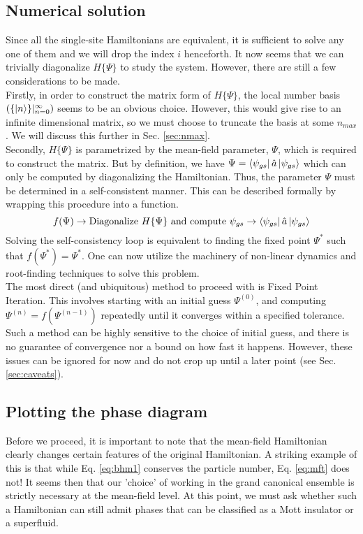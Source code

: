\subsection{Numerical solution}
Since all the single-site Hamiltonians are equivalent, it is sufficient to solve any one of them and we will drop the index $i$ henceforth. It now seems that we can trivially diagonalize $H\{\Psi\}$ to study the system. However, there are still a few considerations to be made. 
\vspace{0.5cm}\\
Firstly, in order to construct the matrix form of $H\{\Psi\}$, the local number basis $(\{\ket{n}\}|_{n = 0}^{\infty})$ seems to be an obvious choice. However, this would give rise to an infinite dimensional matrix, so we must choose to truncate the basis at some $n_{max}$. We will discuss this further in Sec. \ref{sec:nmax}.
\vspace{0.5cm}\\
Secondly, $H\{\Psi\}$ is parametrized by the mean-field parameter, $\Psi$, which is required to construct the matrix. But by definition, we have $\Psi = \bra{\psi_{gs}}\hat{a}\ket{\psi_{gs}}$ which can only be computed by diagonalizing the Hamiltonian. Thus, the parameter $\Psi$ must be determined in a self-consistent manner. This can be described formally by wrapping this procedure into a function.
\begin{equation}\label{eq:self_fn}
    f(\Psi) \rightarrow \text{Diagonalize } H\{\Psi\} \text{ and compute } \psi_{gs} \rightarrow \bra{\psi_{gs}}\hat{a}\ket{\psi_{gs}}
\end{equation}
Solving the self-consistency loop is equivalent to finding the fixed point $\Psi^*$ such that $f(\Psi^*) = \Psi^*$. One can now utilize the machinery of non-linear dynamics and root-finding techniques to solve this problem.
\vspace{0.5cm}\\
The most direct (and ubiquitous) method to proceed with is Fixed Point Iteration. This involves starting with an initial guess $\Psi^{(0)}$, and computing $\Psi^{(n)} = f(\Psi^{(n-1)})$ repeatedly until it converges within a specified tolerance. Such a method can be highly sensitive to the choice of initial guess, and there is no guarantee of convergence nor a bound on how fast it happens. However, these issues can be ignored for now and do not crop up until a later point (see Sec. \ref{sec:caveats}).

\subsection{Plotting the phase diagram}
Before we proceed, it is important to note that the mean-field Hamiltonian clearly changes certain features of the original Hamiltonian. A striking example of this is that while Eq. \ref{eq:bhm1} conserves the particle number, Eq. \ref{eq:mft} does not! It seems then that our 'choice' of working in the grand canonical ensemble is strictly necessary at the mean-field level. At this point, we must ask whether such a Hamiltonian can still admit phases that can be classified as a Mott insulator or a superfluid.

